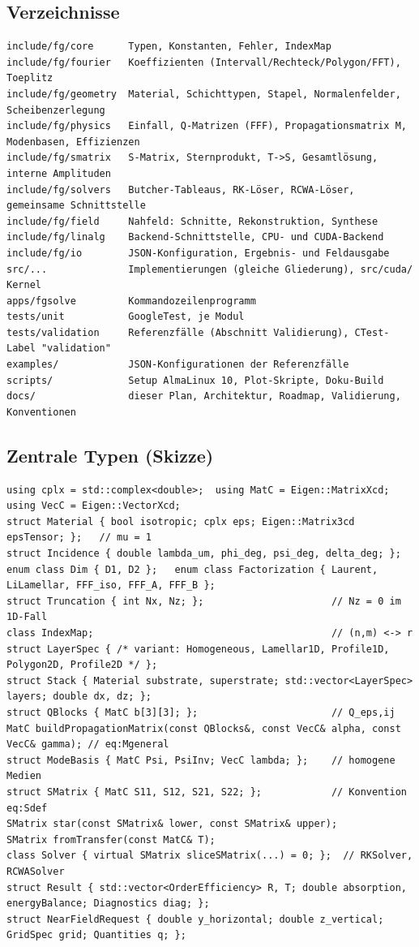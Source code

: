 \subsection{Verzeichnisse}
{\footnotesize\begin{verbatim}
include/fg/core      Typen, Konstanten, Fehler, IndexMap
include/fg/fourier   Koeffizienten (Intervall/Rechteck/Polygon/FFT), Toeplitz
include/fg/geometry  Material, Schichttypen, Stapel, Normalenfelder, Scheibenzerlegung
include/fg/physics   Einfall, Q-Matrizen (FFF), Propagationsmatrix M, Modenbasen, Effizienzen
include/fg/smatrix   S-Matrix, Sternprodukt, T->S, Gesamtlösung, interne Amplituden
include/fg/solvers   Butcher-Tableaus, RK-Löser, RCWA-Löser, gemeinsame Schnittstelle
include/fg/field     Nahfeld: Schnitte, Rekonstruktion, Synthese
include/fg/linalg    Backend-Schnittstelle, CPU- und CUDA-Backend
include/fg/io        JSON-Konfiguration, Ergebnis- und Feldausgabe
src/...              Implementierungen (gleiche Gliederung), src/cuda/ Kernel
apps/fgsolve         Kommandozeilenprogramm
tests/unit           GoogleTest, je Modul
tests/validation     Referenzfälle (Abschnitt Validierung), CTest-Label "validation"
examples/            JSON-Konfigurationen der Referenzfälle
scripts/             Setup AlmaLinux 10, Plot-Skripte, Doku-Build
docs/                dieser Plan, Architektur, Roadmap, Validierung, Konventionen
\end{verbatim}}

\subsection{Zentrale Typen (Skizze)}
{\footnotesize\begin{verbatim}
using cplx = std::complex<double>;  using MatC = Eigen::MatrixXcd;  using VecC = Eigen::VectorXcd;
struct Material { bool isotropic; cplx eps; Eigen::Matrix3cd epsTensor; };   // mu = 1
struct Incidence { double lambda_um, phi_deg, psi_deg, delta_deg; };
enum class Dim { D1, D2 };   enum class Factorization { Laurent, LiLamellar, FFF_iso, FFF_A, FFF_B };
struct Truncation { int Nx, Nz; };                      // Nz = 0 im 1D-Fall
class IndexMap;                                         // (n,m) <-> r
struct LayerSpec { /* variant: Homogeneous, Lamellar1D, Profile1D, Polygon2D, Profile2D */ };
struct Stack { Material substrate, superstrate; std::vector<LayerSpec> layers; double dx, dz; };
struct QBlocks { MatC b[3][3]; };                       // Q_eps,ij
MatC buildPropagationMatrix(const QBlocks&, const VecC& alpha, const VecC& gamma); // eq:Mgeneral
struct ModeBasis { MatC Psi, PsiInv; VecC lambda; };    // homogene Medien
struct SMatrix { MatC S11, S12, S21, S22; };            // Konvention eq:Sdef
SMatrix star(const SMatrix& lower, const SMatrix& upper);
SMatrix fromTransfer(const MatC& T);
class Solver { virtual SMatrix sliceSMatrix(...) = 0; };  // RKSolver, RCWASolver
struct Result { std::vector<OrderEfficiency> R, T; double absorption, energyBalance; Diagnostics diag; };
struct NearFieldRequest { double y_horizontal; double z_vertical; GridSpec grid; Quantities q; };
\end{verbatim}}

